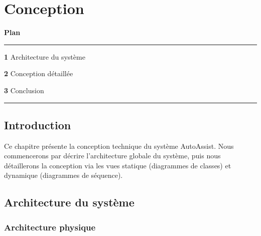 ﻿\chapter{Conception}
\label{chap:conception}

\vspace{2cm}

\noindent\textbf{\Large Plan}

\vspace{0.5cm}
\noindent\rule{\textwidth}{0.4pt}
\vspace{0.3cm}

\begin{list}{}{\setlength{\leftmargin}{1.5cm}\setlength{\itemsep}{6pt}}
  \item \textbf{1} \hspace{0.3cm} Architecture du syst\`{e}me \dotfill \pageref{sec:architecture}
  \item \textbf{2} \hspace{0.3cm} Conception d\'{e}taill\'{e}e \dotfill \pageref{sec:conception_detail}
  \item \textbf{3} \hspace{0.3cm} Conclusion \dotfill \pageref{sec:conclusion_ch2}
\end{list}

\vspace{0.3cm}
\noindent\rule{\textwidth}{0.4pt}

\newpage

\section*{Introduction}

Ce chapitre pr\'{e}sente la conception technique du syst\`{e}me AutoAssist. Nous commencerons par d\'{e}crire l'architecture globale du syst\`{e}me, puis nous d\'{e}taillerons la conception via les vues statique (diagrammes de classes) et dynamique (diagrammes de s\'{e}quence).

\section{Architecture du système}
\label{sec:architecture}

\subsection{Architecture physique}

